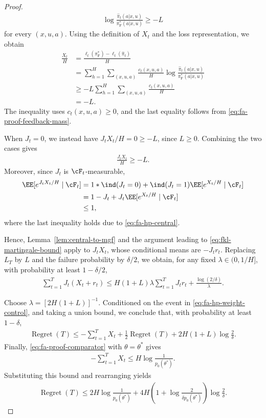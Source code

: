 \documentclass[11pt]{article}
\newcommand{\pif}{\pi_{\mathrm{F}}}
\begin{document}
\begin{proof}
\begin{align*}
    \log\frac{\hat\pi_t(a|x,u)}{\pif^*(a|x,u)}
    \geq-L
\end{align*}
for every $(x,u,a)$.
Using the definition of $X_t$ and the loss representation, we obtain
\begin{align*}
    \frac{X_t}{H}
    &=
    \frac{\ell_t(\pif^*)-\ell_t(\hat\pi_t)}H\\
    &=
    \sum_{h=1}^H\sum_{(x,u,a)}
    \frac{c_t(x,u,a)}H
    \log\frac{\hat\pi_t(a|x,u)}{\pif^*(a|x,u)}\\
    &\geq
    -L\sum_{h=1}^H\sum_{(x,u,a)}
    \frac{c_t(x,u,a)}H\\
    &=-L.
\end{align*}
The inequality uses $c_t(x,u,a)\geq0$, and the last equality
follows from \eqref{eq:fa-proof-feedback-mass}.

When $J_t=0$, we instead have $J_tX_t/H=0\geq-L$, since $L\geq0$.
Combining the two cases gives
\begin{align*}
    \frac{J_tX_t}{H}\geq-L.
\end{align*}
Moreover, since $J_t$ is $\cF_t$-measurable, 
\begin{align*}
    \EE[e^{J_tX_t/H}\mid\cF_t]
    &=1 * \ind(J_t=0)+\ind(J_t=1) \EE[e^{X_t/H}\mid\cF_t]\\ 
    &=1-J_t+J_t\EE[e^{X_t/H}\mid\cF_t]\\
    &\leq1,
\end{align*}
where the last inequality holds due to \eqref{eq:fa-hp-central}.

Hence, Lemma~\ref{lem:central-to-mgf} and the argument leading
to \eqref{eq:fkl-martingale-bound} apply to $J_tX_t$, whose conditional means are $-J_tr_t$.
Replacing $L_T$ by $L$ and the failure probability by $\delta/2$,
we obtain, for any fixed $\lambda\in(0,1/H]$, with probability
at least $1-\delta/2$,
\begin{align*}
    \sum_{t=1}^T J_t(X_t+r_t)
    \leq
    H(1+L)\lambda\sum_{t=1}^T J_tr_t
    +
    \frac{\log(2/\delta)}{\lambda}.
\end{align*}

Choose $\lambda=[2H(1+L)]^{-1}$.
Conditioned on the event in \eqref{eq:fa-hp-weight-control},
and taking a union bound, we conclude
that, with probability at least $1-\delta$,
\begin{align*}
    \operatorname{Regret}(T)
    \leq
    -\sum_{t=1}^T X_t
    +
    \frac12\operatorname{Regret}(T)
    +
    2H(1+L)\log\frac2\delta.
\end{align*}
Finally, \eqref{eq:fa-proof-comparator} with
$\theta=\theta^*$ gives
\begin{align*}
    -\sum_{t=1}^T X_t
    \leq H\log\frac1{p_0(\theta^*)}.
\end{align*}
Substituting this bound and rearranging yields
\begin{align*}
    \operatorname{Regret}(T)
    \leq
    2H\log\frac1{p_0(\theta^*)}
    +
    4H\left(
        1+\log\frac{2}{\delta p_0(\theta^*)}
    \right)\log\frac2\delta.
\end{align*}
\end{proof}
\end{document}
